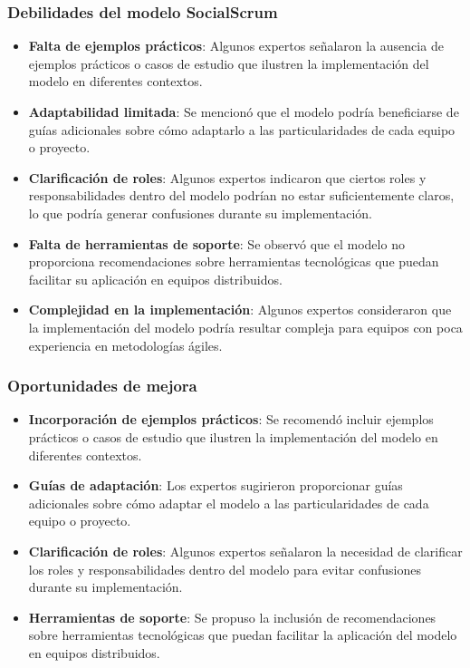 \subsubsection{Debilidades del modelo SocialScrum}
\begin{itemize}
    \item \textbf{Falta de ejemplos prácticos}: Algunos expertos señalaron la ausencia de ejemplos prácticos o casos de estudio que ilustren la implementación del modelo en diferentes contextos.
    \item \textbf{Adaptabilidad limitada}: Se mencionó que el modelo podría beneficiarse de guías adicionales sobre cómo adaptarlo a las particularidades de cada equipo o proyecto.
    \item \textbf{Clarificación de roles}: Algunos expertos indicaron que ciertos roles y responsabilidades dentro del modelo podrían no estar suficientemente claros, lo que podría generar confusiones durante su implementación.
    \item \textbf{Falta de herramientas de soporte}: Se observó que el modelo no proporciona recomendaciones sobre herramientas tecnológicas que puedan facilitar su aplicación en equipos distribuidos.
    \item \textbf{Complejidad en la implementación}: Algunos expertos consideraron que la implementación del modelo podría resultar compleja para equipos con poca experiencia en metodologías ágiles.
\end{itemize}

\subsubsection{Oportunidades de mejora}
\begin{itemize}
    \item \textbf{Incorporación de ejemplos prácticos}: Se recomendó incluir ejemplos prácticos o casos de estudio que ilustren la implementación del modelo en diferentes contextos.
    \item \textbf{Guías de adaptación}: Los expertos sugirieron proporcionar guías adicionales sobre cómo adaptar el modelo a las particularidades de cada equipo o proyecto.
    \item \textbf{Clarificación de roles}: Algunos expertos señalaron la necesidad de clarificar los roles y responsabilidades dentro del modelo para evitar confusiones durante su implementación.
    \item \textbf{Herramientas de soporte}: Se propuso la inclusión de recomendaciones sobre herramientas tecnológicas que puedan facilitar la aplicación del modelo en equipos distribuidos.
\end{itemize}

